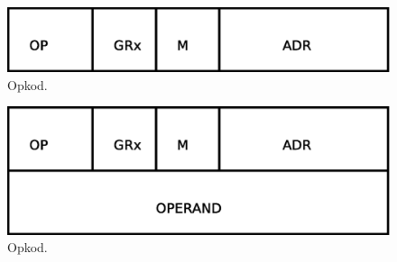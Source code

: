 \begin{center}
\begin{figure}[H]
    \centering
\includegraphics[scale=0.40]{../grafik/opkod1.eps}
\caption{Opkod.}
\label{fig:opkod1}
\end{figure}
\end{center}

\begin{center}
\begin{figure}[H]
    \centering
\includegraphics[scale=0.40]{../grafik/opkod2.eps}
\caption{Opkod.}
\label{fig:opkod2}
\end{figure}
\end{center}
